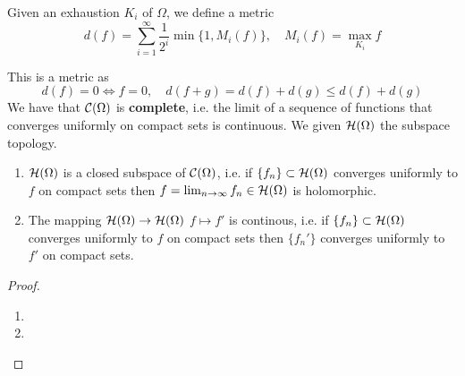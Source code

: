 \documentclass{article}
\begin{document}
\begin{definition}
Given an exhaustion \(K_i\) of \(\Omega\), we define a metric
\begin{equation}d(f) = \sum_{i = 1}^\infty\frac{1}{2^i}\min\{1, M_i(f)\}, \quad M_i(f) = \max_{K_i}f\end{equation}
\end{definition}
This is a metric as
\begin{equation}d(f) = 0 \iff f = 0, \quad d(f + g) = d(f) + d(g) \leq d(f) + d(g)\end{equation}
We have that \(\mathcal{C}(\Omega)\) is \textbf{complete}, i.e. the limit of a sequence of functions that converges uniformly on compact sets is continuous. We given \(\mathcal{H}(\Omega)\) the subspace topology.
\begin{theorem}[Weierstrass]
\begin{enumerate}
  \item \(\mathcal{H}(\Omega)\) is a closed subspace of \(\mathcal{C}(\Omega)\), i.e. if \(\{f_n\} \subset \mathcal{H}(\Omega)\) converges uniformly to \(f\) on compact sets then \(f = \lim_{n \to \infty}f_n \in \mathcal{H}(\Omega)\) is holomorphic.
  \item The mapping \(\mathcal{H}(\Omega) \to \mathcal{H}(\Omega)\) \(f \mapsto f'\) is continous, i.e. if \(\{f_n\} \subset \mathcal{H}(\Omega)\) converges uniformly to \(f\) on compact sets then \(\{f_n'\}\) converges uniformly to \(f'\) on compact sets.
\end{enumerate}
\end{theorem}
\begin{proof}
\begin{enumerate}

  \item {}

  \item {}

\end{enumerate}
\end{proof}
\end{document}
